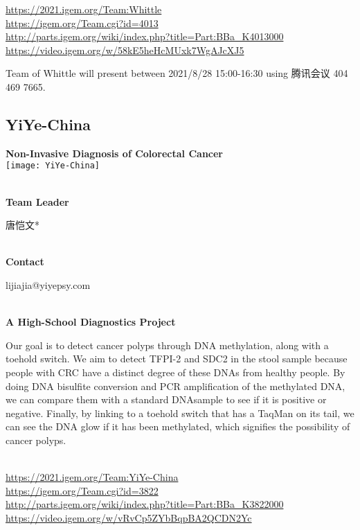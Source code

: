 \url{https://2021.igem.org/Team:Whittle }\\
\url{https://igem.org/Team.cgi?id=4013 }\\
\url{http://parts.igem.org/wiki/index.php?title=Part:BBa_K4013000 }\\
\url{https://video.igem.org/w/58kE5heHcMUxk7WgAJcXJ5 }\\

\vfill{}









Team of Whittle will present between       2021/8/28 15:00-16:30  using 腾讯会议 404 469 7665.
\newpage


\subsection{\textcolor{Blu}{ YiYe-China } }
\vspace{5mm}
\begin{center}
\large{
  \textbf{ Non-Invasive Diagnosis of Colorectal Cancer }\\
  \texttt{[image: YiYe-China]}
}
\end{center}
\textbf{\\Team Leader}

  唐恺文*


\textbf{\\Contact}

  lijiajia@yiyepsy.com


\textbf{\\A High-School Diagnostics Project\\}\begin{spacing}{1.5}

Our goal is to detect cancer polyps through DNA methylation, along with a toehold switch. We aim to detect TFPI-2 and SDC2 in the stool sample because people with CRC have a distinct degree of these DNAs from healthy people. By doing DNA bisulfite conversion and PCR amplification of the methylated DNA, we can compare them with a standard DNAsample to see if it is positive or negative. Finally, by linking to a toehold switch that has a TaqMan on its tail, we can see the DNA glow if it has been methylated, which signifies the possibility of cancer polyps.\end{spacing}
\\

\url{https://2021.igem.org/Team:YiYe-China }\\
\url{https://igem.org/Team.cgi?id=3822 }\\
\url{http://parts.igem.org/wiki/index.php?title=Part:BBa_K3822000 }\\
\url{https://video.igem.org/w/vRvCp5ZYbBqpBA2QCDN2Yc }\\

